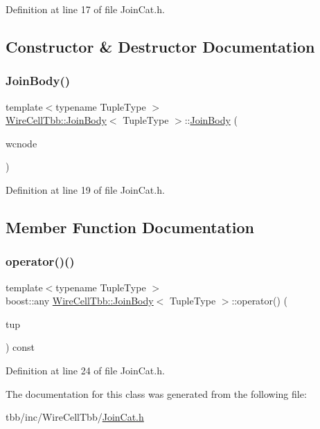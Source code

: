 Definition at line 17 of file Join\+Cat.\+h.



\subsection{Constructor \& Destructor Documentation}
\mbox{\label{class_wire_cell_tbb_1_1_join_body_a208886fd0ca7d1108e6c73312af06f74}} 
\subsubsection{\texorpdfstring{Join\+Body()}{JoinBody()}}
{\footnotesize\ttfamily template$<$typename Tuple\+Type $>$ \\
\hyperlink{class_wire_cell_tbb_1_1_join_body}{Wire\+Cell\+Tbb\+::\+Join\+Body}$<$ Tuple\+Type $>$\+::\hyperlink{class_wire_cell_tbb_1_1_join_body}{Join\+Body} (\begin{DoxyParamCaption}\item[{\hyperlink{class_wire_cell_1_1_interface_a09c548fb8266cfa39afb2e74a4615c37}{Wire\+Cell\+::\+I\+Node\+::pointer}}]{wcnode }\end{DoxyParamCaption})\hspace{0.3cm}{\ttfamily [inline]}}



Definition at line 19 of file Join\+Cat.\+h.



\subsection{Member Function Documentation}
\mbox{\label{class_wire_cell_tbb_1_1_join_body_a16d92b477835d299bcae3abb90cf9cbc}} 
\subsubsection{\texorpdfstring{operator()()}{operator()()}}
{\footnotesize\ttfamily template$<$typename Tuple\+Type $>$ \\
boost\+::any \hyperlink{class_wire_cell_tbb_1_1_join_body}{Wire\+Cell\+Tbb\+::\+Join\+Body}$<$ Tuple\+Type $>$\+::operator() (\begin{DoxyParamCaption}\item[{const Tuple\+Type \&}]{tup }\end{DoxyParamCaption}) const\hspace{0.3cm}{\ttfamily [inline]}}



Definition at line 24 of file Join\+Cat.\+h.



The documentation for this class was generated from the following file\+:\begin{DoxyCompactItemize}
\item 
tbb/inc/\+Wire\+Cell\+Tbb/\hyperlink{_join_cat_8h}{Join\+Cat.\+h}\end{DoxyCompactItemize}
